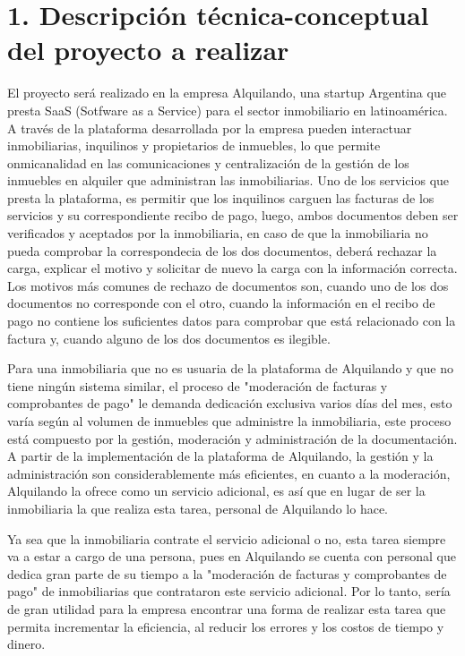 \documentclass[
11pt, %
]{charter}
\begin{document}
\section{1. Descripción técnica-conceptual del proyecto a realizar}
\label{sec:descripcion}
\vspace{5px}
\begin{•}
El proyecto será realizado en la empresa Alquilando, una startup Argentina que presta SaaS (Sotfware as a Service) para el sector inmobiliario en latinoamérica. A través de la plataforma desarrollada por la empresa pueden interactuar inmobiliarias, inquilinos y propietarios de inmuebles, lo que permite onmicanalidad en las comunicaciones y centralización de la gestión de los inmuebles en alquiler que administran las inmobiliarias. Uno de los servicios que presta la plataforma, es permitir que los inquilinos carguen las facturas de los servicios y su correspondiente recibo de pago, luego, ambos documentos deben ser verificados y aceptados por la inmobiliaria, en caso de que la inmobiliaria no pueda comprobar la correspondecia de los dos documentos, deberá rechazar la carga, explicar el motivo y solicitar de nuevo la carga con la información correcta. Los motivos más comunes de rechazo de documentos son, cuando uno de los dos documentos no corresponde con el otro, cuando la información en el recibo de pago no contiene los suficientes datos para comprobar que está relacionado con la factura y, cuando alguno de los dos documentos es ilegible.

Para una inmobiliaria que no es usuaria de la plataforma de Alquilando y que no tiene ningún sistema similar, el proceso de "moderación de facturas y comprobantes de pago" le demanda dedicación exclusiva varios días del mes, esto varía según al volumen de inmuebles que administre la inmobiliaria, este proceso está compuesto por la gestión, moderación y administración de la documentación. A partir de la implementación de la plataforma de Alquilando, la gestión y la administración son considerablemente más eficientes, en cuanto a la moderación, Alquilando la ofrece como un servicio adicional, es así que en lugar de ser la inmobiliaria la que realiza esta tarea, personal de Alquilando lo hace.

Ya sea que la inmobiliaria contrate el servicio adicional o no, esta tarea siempre va a estar a cargo de una persona, pues en Alquilando se cuenta con personal que dedica gran parte de su tiempo a la "moderación de facturas y comprobantes de pago" de inmobiliarias que contrataron este servicio adicional. Por lo tanto, sería de gran utilidad para la empresa encontrar una forma de realizar esta tarea que permita incrementar la eficiencia, al reducir los errores y los costos de tiempo y dinero.


\end{•}
\end{document}
